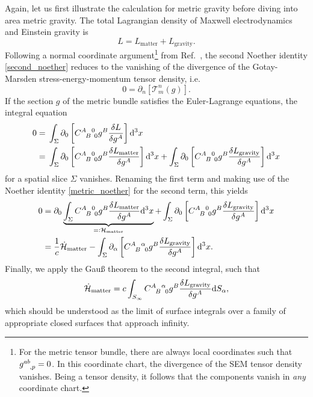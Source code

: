 Again, let us first illustrate the calculation for metric gravity before diving into area metric gravity. The total Lagrangian density of Maxwell electrodynamics and Einstein gravity is
\begin{equation}\label{metric_noether}
  L = L_\text{matter} + L_\text{gravity}.
\end{equation}
Following a normal coordinate argument\footnote{For the metric tensor bundle, there are always local coordinates such that $g^{ab}_{\hphantom{ab},p}=0$. In this coordinate chart, the divergence of the SEM tensor density vanishes. Being a tensor density, it follows that the components vanish in \emph{any} coordinate chart.} from Ref.~\cite{Gotay_1992}, the second Noether identity \eqref{second_noether} reduces to the vanishing of the divergence of the Gotay-Marsden stress-energy-momentum tensor density, i.e.
\begin{equation}
  0 = \partial_n\left\lbrack\mathcal  T^n_m(g)\right\rbrack.
\end{equation}
If the section $g$ of the metric bundle satisfies the Euler-Lagrange equations, the integral equation
\begin{equation}
  \begin{aligned}
    0 = {} & \int_\Sigma \partial_0\left\lbrack \gmc{A}{B}{0}{0} g^B \frac{\delta L}{\delta g^A}\right\rbrack\mathrm d^3x \\
    = {} & \int_\Sigma \partial_0\left\lbrack \gmc{A}{B}{0}{0} g^B \frac{\delta L_\text{matter}}{\delta g^A}\right\rbrack\mathrm d^3x + \int_\Sigma \partial_0\left\lbrack \gmc{A}{B}{0}{0} g^B \frac{\delta L_\text{gravity}}{\delta g^A}\right\rbrack\mathrm d^3x
  \end{aligned}
\end{equation}
for a spatial slice $\Sigma$ vanishes. Renaming the first term and making use of the Noether identity \eqref{metric_noether} for the second term, this yields
\begin{equation}
  \begin{aligned}
    0 = {} & \partial_0 \underbrace{\int_\Sigma \gmc{A}{B}{0}{0} g^B \frac{\delta L_\text{matter}}{\delta g^A}\mathrm d^3x}_{=\vcentcolon \mathcal H_\text{matter}} + \int_\Sigma \partial_0\left\lbrack \gmc{A}{B}{0}{0} g^B \frac{\delta L_\text{gravity}}{\delta g^A}\right\rbrack\mathrm d^3x \\
    = {} & \frac{1}{c} \dot{\mathcal H}_\text{matter} - \int_\Sigma \partial_\alpha\left\lbrack \gmc{A}{B}{\alpha}{0} g^B \frac{\delta L_\text{gravity}}{\delta g^A}\right\rbrack\mathrm d^3x.
  \end{aligned}
\end{equation}
Finally, we apply the Gauß theorem to the second integral, such that
\begin{equation}\label{first_balance_equation}
  \dot{\mathcal H}_\text{matter} = c \int_{S_\infty} \gmc{A}{B}{\alpha}{0} g^B \frac{\delta L_\text{gravity}}{\delta g^A} \mathrm dS_\alpha,
\end{equation}
which should be understood as the limit of surface integrals over a family of appropriate closed surfaces that approach infinity.

